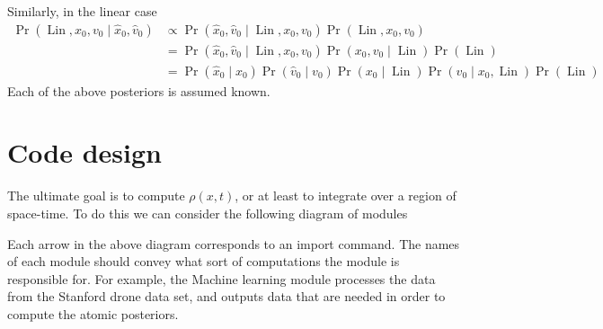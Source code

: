 \documentclass[12pt]{amsart}
\DeclareMathOperator{\Lin}{Lin}
\begin{document}
Similarly, in the linear case
\begin{align*}
	\Pr( \Lin , x_0, v_0 \mid \hat{x}_0, \hat{v}_0 ) &\propto \Pr( \hat{x}_0, \hat{v}_0 \mid \Lin, x_0, v_0 ) \Pr( \Lin, x_0, v_0 ) \\
	&= \Pr( \hat{x}_0, \hat{v}_0 \mid \Lin, x_0, v_0 ) \Pr( x_0, v_0 \mid \Lin ) \Pr(\Lin) \\
	&= \Pr( \hat{x}_0 \mid x_0 ) \Pr( \hat{v}_0 \mid v_0 ) \Pr( x_0 \mid \Lin ) \Pr( v_0 \mid x_0, \Lin ) \Pr(\Lin)
\end{align*}
Each of the above posteriors is assumed known.


\section{Code design}

The ultimate goal is to compute $\rho(x,t)$, or at least to integrate over a region of space-time.
To do this we can consider the following diagram of modules


Each arrow in the above diagram corresponds to an import command.
The names of each module should convey what sort of computations the module is responsible for.
For example, the Machine learning module processes the data from the Stanford drone data set, and outputs data that are needed in order to compute the atomic posteriors.

\appendix
\end{document}
